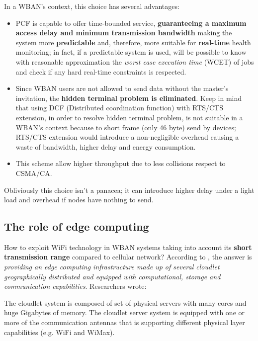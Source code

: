 \documentclass[sigchi]{acmart}
\begin{document}
In a WBAN's context, this choice has several advantages:

\begin{itemize}

\item PCF is capable to offer time-bounded service, \textbf{guaranteeing a maximum access delay and minimum transmission bandwidth} making the system more \textbf{predictable} and, therefore, more suitable for \textbf{real-time} health monitoring; in fact, if a predictable system is used, will be possible to know with reasonable approximation the \textit{worst case execution time} (WCET) of jobs and check if any hard real-time constraints is respected.

\item Since WBAN users are not allowed to send data without the master's invitation, the \textbf{hidden terminal problem is eliminated}. Keep in mind that using DCF (Distributed coordination function) with RTS/CTS extension, in order to resolve hidden terminal problem, is not suitable in a WBAN's context because to short frame (only 46 byte) send by devices; RTS/CTS extension would introduce a non-negligible overhead causing a waste of bandwidth, higher delay and energy consumption.\cite{schiller2003mobile}

\item This scheme allow higher throughput due to less collisions respect to CSMA/CA.\cite{schiller2003mobile}

\end{itemize}

Obliviously this choice isn't a panacea; it can introduce higher delay under a light load and overhead if nodes have nothing to send.\cite{schiller2003mobile}

\subsection{The role of edge computing}

How to exploit WiFi technology in WBAN systems taking into account its \textbf{short transmission range} compared to cellular network? According to \citet{MSAReport}, the answer is \textit{providing an edge computing infrastructure made up of several cloudlet geographically distributed and equipped with computational, storage and communication capabilities}. Researchers wrote:

\vspace{0.3cm}

\begin{quoting}[font=itshape, begintext={``}, endtext={''\cite[par.~4.1]{MSAReport}}]
The cloudlet system is composed of set of physical servers with many cores and huge Gigabytes of memory. The cloudlet server system is equipped with one or more of the communication antennas that is supporting different physical layer capabilities (e.g. WiFi and WiMax). 
\end{quoting}
\end{document}
